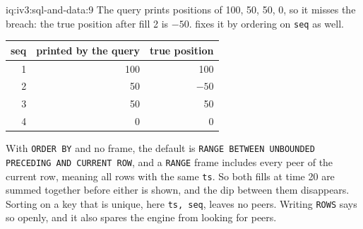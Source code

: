 \begin{solution}{iq:iv3:sql-and-data:9}
The query prints positions of 100, 50, 50, 0, so it misses the breach: the true position after fill 2 is $-50$.  fixes it by ordering on \texttt{seq} as well.
\enlargethispage{-3\baselineskip}%
\label{lst:iv3:sq:posfixed}
\begin{center}\small
\begin{tabular}{rrr}
seq & printed by the query & true position\\\hline
1 & 100 & 100\\
2 & 50 & $-50$\\
3 & 50 & 50\\
4 & 0 & 0
\end{tabular}
\end{center}
With \texttt{ORDER BY} and no frame, the default is \texttt{RANGE BETWEEN UNBOUNDED PRECEDING AND CURRENT ROW}, and a \texttt{RANGE} frame includes every peer of the current row, meaning all rows with the same \texttt{ts}. So both fills at time 20 are summed together before either is shown, and the dip between them disappears. Sorting on a key that is unique, here \texttt{ts, seq}, leaves no peers. Writing \texttt{ROWS} says so openly, and it also spares the engine from looking for peers.

\end{solution}

